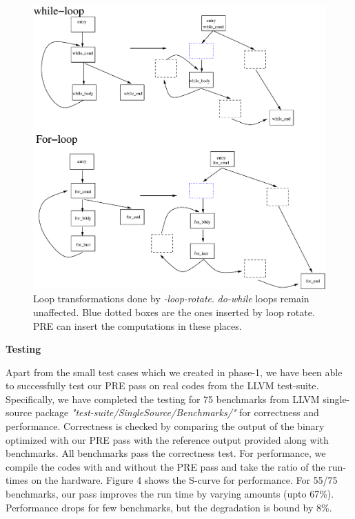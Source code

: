 \documentclass[10pt,twoside]{report}
\begin{document}
\begin{figure}[htbp]
  \begin{center}
     \includegraphics[scale=0.5]{3} 
  \end{center}
  \caption{Loop transformations done by \emph{-loop-rotate}. \emph{do-while}
    loops remain unaffected. Blue dotted boxes are the ones inserted by loop
      rotate. PRE can insert the computations in these places.}

  \label{fig:3} 
  \end{figure}


\newpage  
\begin{flushleft}
\textbf{\Large{Testing}}
\end{flushleft}

Apart from the small test cases which we created in phase-1, we have been able to 
successfully test our PRE pass on real codes from the LLVM test-suite. Specifically, we have
completed the testing for 75 benchmarks from LLVM single-source package \emph{"test-suite/SingleSource/Benchmarks/"} for correctness and performance. Correctness is checked by
comparing the output of the binary optimized with our PRE pass with the reference output 
provided along with benchmarks. All benchmarks pass the correctness test. For performance, 
we compile the codes with and without the PRE pass and take the ratio of the run-times on 
the hardware. Figure 4 shows the S-curve for performance. For 55/75 benchmarks, our pass improves 
the run time by varying amounts (upto 67\%). Performance drops for few benchmarks, but the degradation is bound by 8\%.
\end{document}
